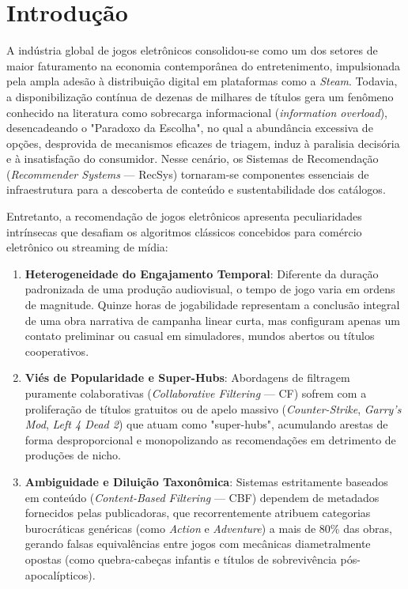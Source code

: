 \documentclass[conference]{IEEEtran}
\begin{document}
\section{Introdução}

A indústria global de jogos eletrônicos consolidou-se como um dos setores de maior faturamento na economia contemporânea do entretenimento, impulsionada pela ampla adesão à distribuição digital em plataformas como a \textit{Steam}. Todavia, a disponibilização contínua de dezenas de milhares de títulos gera um fenômeno conhecido na literatura como sobrecarga informacional (\textit{information overload}), desencadeando o "Paradoxo da Escolha", no qual a abundância excessiva de opções, desprovida de mecanismos eficazes de triagem, induz à paralisia decisória e à insatisfação do consumidor. Nesse cenário, os Sistemas de Recomendação (\textit{Recommender Systems} --- RecSys) tornaram-se componentes essenciais de infraestrutura para a descoberta de conteúdo e sustentabilidade dos catálogos.

Entretanto, a recomendação de jogos eletrônicos apresenta peculiaridades intrínsecas que desafiam os algoritmos clássicos concebidos para comércio eletrônico ou streaming de mídia:
\begin{enumerate}
    \item \textbf{Heterogeneidade do Engajamento Temporal}: Diferente da duração padronizada de uma produção audiovisual, o tempo de jogo varia em ordens de magnitude. Quinze horas de jogabilidade representam a conclusão integral de uma obra narrativa de campanha linear curta, mas configuram apenas um contato preliminar ou casual em simuladores, mundos abertos ou títulos cooperativos.
    \item \textbf{Viés de Popularidade e Super-Hubs}: Abordagens de filtragem puramente colaborativas (\textit{Collaborative Filtering} --- CF) sofrem com a proliferação de títulos gratuitos ou de apelo massivo (\textit{Counter-Strike}, \textit{Garry's Mod}, \textit{Left 4 Dead 2}) que atuam como "super-hubs", acumulando arestas de forma desproporcional e monopolizando as recomendações em detrimento de produções de nicho.
    \item \textbf{Ambiguidade e Diluição Taxonômica}: Sistemas estritamente baseados em conteúdo (\textit{Content-Based Filtering} --- CBF) dependem de metadados fornecidos pelas publicadoras, que recorrentemente atribuem categorias burocráticas genéricas (como \textit{Action} e \textit{Adventure}) a mais de 80\% das obras, gerando falsas equivalências entre jogos com mecânicas diametralmente opostas (como quebra-cabeças infantis e títulos de sobrevivência pós-apocalípticos).
\end{enumerate}
\end{document}
